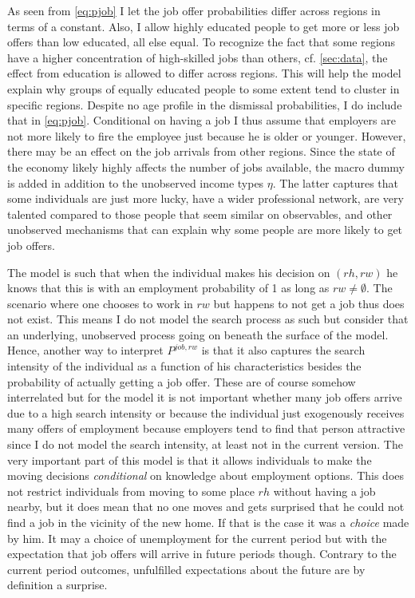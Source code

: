 As seen from \eqref{eq:pjob} I let the job offer probabilities differ across regions in terms of a constant. Also, I allow highly educated people to get more or less job offers than low educated, all else equal. To recognize the fact that some regions have a higher concentration of high-skilled jobs than others, cf. \autoref{sec:data}, the effect from education is allowed to differ across regions. This will help the model explain why groups of equally educated people to some extent tend to cluster in specific regions. Despite no age profile in the dismissal probabilities, I do include that in \eqref{eq:pjob}. Conditional on having a job I thus assume that employers are not more likely to fire the employee just because he is older or younger. However, there may be an effect on the job arrivals from other regions. Since the state of the economy likely highly affects the number of jobs available, the macro dummy is added in addition to the unobserved income types $\eta$. The latter captures that some individuals are just more lucky, have a wider professional network, are very talented compared to those people that seem similar on observables, and other unobserved mechanisms that can explain why some people are more likely to get job offers. 
 
The model is such that when the individual makes his decision on $(rh,rw)$ he knows that this is with an employment probability of 1 as long as $rw\neq\emptyset$. The scenario where one chooses to work in $rw$ but happens to not get a job thus does not exist. This means I do not model the search process as such but consider that an underlying, unobserved process going on beneath the surface of the model. Hence, another way to interpret $P^{job,rw}$ is that it also captures the search intensity of the individual as a function of his characteristics besides the probability of actually getting a job offer. These are of course somehow interrelated but for the model it is not important whether many job offers arrive due to a high search intensity or because the individual just exogenously receives many offers of employment because employers tend to find that person attractive since I do not model the search intensity, at least not in the current version. The very important part of this model is that it allows individuals to make the moving decisions \textit{conditional} on knowledge about employment options. This does not restrict individuals from moving to some place $rh$ without having a job nearby, but it does mean that no one moves and gets surprised that he could not find a job in the vicinity of the new home. If that is the case it was a \textit{choice} made by him. It may a choice of unemployment for the current period but with the expectation that job offers will arrive in future periods though. Contrary to the current period outcomes, unfulfilled expectations about the future are by definition a surprise. 

